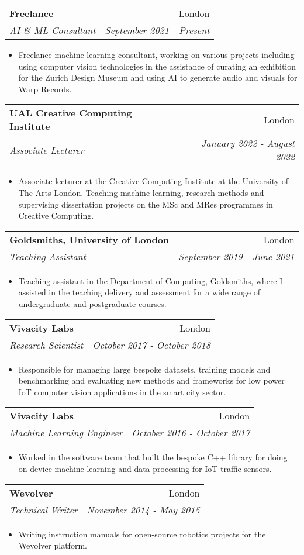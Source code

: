 \documentclass[letterpaper,11pt]{article}
\makeatletter
\newcommand{\resumeItem}[2]{
  \item\small{
    \textbf{#1}{ #2 \vspace{-2pt}}
  }
}
\newcommand{\resumeSubheading}[4]{
  \vspace{-1pt}\item
    \begin{tabular*}{0.97\textwidth}{l@{\extracolsep{\fill}}r}
      \textbf{#1} & #2 \\
      \textit{\small#3} & \textit{\small #4} \\
    \end{tabular*}\vspace{-5pt}
}
\newcommand{\resumeItemListStart}{\begin{itemize}}
\newcommand{\resumeItemListEnd}{\end{itemize}\vspace{-5pt}}
\makeatother
\begin{document}
    \resumeSubheading
      {Freelance}{London}
      {AI \& ML Consultant}{September 2021 - Present}
      \resumeItemListStart
        \resumeItem{}
          {Freelance machine learning consultant, working on various projects including using computer vision technologies in the assistance of curating an exhibition for the Zurich Design Museum and using AI to generate audio and visuals for Warp Records.}
    \resumeItemListEnd
            
           
    \resumeSubheading
      {UAL Creative Computing Institute}{London}
      {Associate Lecturer}{January 2022 - August 2022}
      \resumeItemListStart
        \resumeItem{}
          {Associate lecturer at the Creative Computing Institute at the University of The Arts London. Teaching machine learning, research methods and supervising dissertation projects on the MSc and MRes programmes in Creative Computing.}
        \resumeItemListEnd


    \resumeSubheading
      {Goldsmiths, University of London}{London}
      {Teaching Assistant}{September 2019 - June 2021}
      \resumeItemListStart
        \resumeItem{}
          {Teaching assistant in the Department of Computing, Goldsmiths, where I assisted in the teaching delivery and assessment for a wide range of undergraduate and postgraduate courses.}
    \resumeItemListEnd
    
    \resumeSubheading
      {Vivacity Labs}{London}
      {Research Scientist}{October 2017 - October 2018}
      \resumeItemListStart
        \resumeItem{}
          {Responsible for managing large bespoke datasets, training models and benchmarking and evaluating new methods and frameworks for low power IoT computer vision applications in the smart city sector. }
        \resumeItemListEnd
        
    \resumeSubheading
      {Vivacity Labs}{London}
      {Machine Learning Engineer}{October 2016 - October 2017}
      \resumeItemListStart
        \resumeItem{}
          {Worked in the software team that built the bespoke C++ library for doing on-device machine learning and data processing for IoT traffic sensors.}
        \resumeItemListEnd

      
    \resumeSubheading
      {Wevolver}{London}
      {Technical Writer}{November 2014 - May 2015}
      \resumeItemListStart
        \resumeItem{}
          {Writing instruction manuals for open-source robotics projects for the Wevolver platform. }
      \resumeItemListEnd
\end{document}
